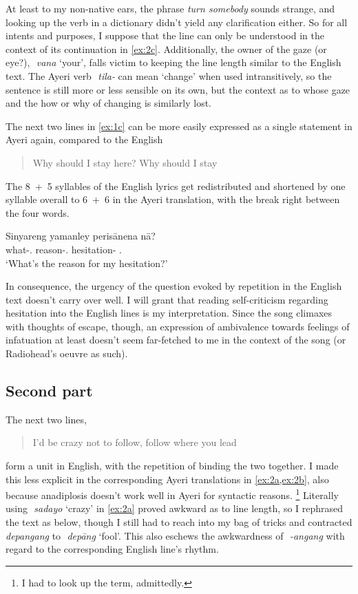 \documentclass[12pt,paper=a4]{scrartcl}
\newcommand{\fw}[1]{\textit{#1}} %
\newcommand{\zwsp}{\mbox{​}} %
\newcommand{\rayr}[2]{\zwsp\smash{{\Tagati #1}} \emph{#2}} %
\newcommand{\xayr}[3]{\zwsp\smash{\Tagati #1} \emph{#2} `#3'} %
\begin{document}
At least to my non-native ears, the phrase \fw{turn somebody} sounds strange,
and looking up the verb in a dictionary didn't yield any clarification either.
So for all intents and purposes, I suppose that the line can only be understood
in the context of its continuation in \cref{ex:2c}. Additionally, the owner of
the gaze (or eye?), \xayr{vn}{vana}{your}, falls victim to keeping the line
length similar to the English text. The Ayeri verb \rayr{til/}{tila-} can mean
`change' when used intransitively, so the sentence is still more or less
sensible on its own, but the context as to whose gaze and the how or why of
changing is similarly lost.

The next two lines in \cref{ex:1c} can be more easily expressed as a single
statement in Ayeri again, compared to the English \blockquote{Why should I stay
here? Why should I stay}. The 8~+~5 syllables of the English lyrics get
redistributed and shortened by one syllable overall to 6~+~6 in the Ayeri
translation, with the break right between the four words.

\begin{exe}
\ex \label{ex:1c}
	\gll Sinyareng yamanley perisānena nā? \\
		what-\Aarg.\Inan{} reason-\Parg.\Inan{} hesitation-\Gen{}
		\Fsg.\Gen{} \\
	\trans `What's the reason for my hesitation?'
\end{exe}

In consequence, the urgency of the question evoked by repetition in the English
text doesn't carry over well. I will grant that reading self-criticism
regarding hesitation into the English lines is my interpretation. Since the
song climaxes with thoughts of escape, though, an expression of ambivalence
towards feelings of infatuation at least doesn't seem far-fetched to me in the
context of the song (or Radiohead's oeuvre as such).

\subsection{Second part}

The next two lines, \blockquote{I'd be crazy not to follow, follow where you
lead} form a unit in English, with the repetition of  binding
the two together. I made this less explicit in the corresponding Ayeri
translations in \cref{ex:2a,ex:2b}, also because anadiplosis doesn't work well
in Ayeri for syntactic reasons.%
%
	\footnote{I had to look up the term, admittedly.}
%
Literally using \xayr{sdyo}{sadayo}{crazy} in \cref{ex:2a} proved awkward as to
line length, so I rephrased the text as below, though I still had to reach into
my bag of tricks and contracted \rayr{depNNF}{depangang} to
\xayr{depaaNF}{depāng}{fool}. This also eschews the awkwardness of
\rayr{/ANNF}{-angang} with regard to the corresponding English line's rhythm.
\end{document}
